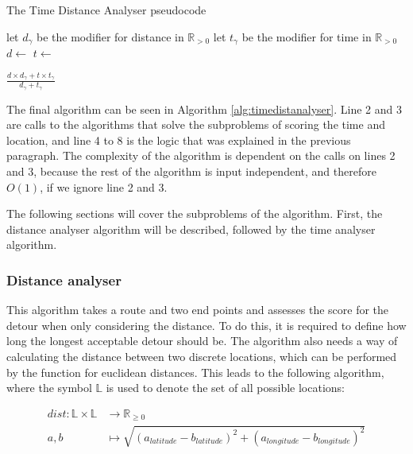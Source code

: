 \begin{algorithm}
	\caption{The Time Distance Analyser pseudocode}
	\label{alg:timedistanalyser}
	\begin{algorithmic}[1]
		\Require 
		\Statex let $d_\gamma$ be the modifier for distance in $\mathbb{R}_{>0}$
		\Statex let $t_\gamma$ be the modifier for time in $\mathbb{R}_{>0}$
		\Statex 
			\State $d\gets$
			\State $t\gets$
			
				\State \Return $\frac{d\times d_\gamma+t\times t_\gamma}{d_\gamma+t_\gamma}$
			\Else
				\State{}
			\EndIf
		\EndFunction
	\end{algorithmic}
\end{algorithm}

The final algorithm can be seen in Algorithm \ref{alg:timedistanalyser}.
Line 2 and 3 are calls to the algorithms that solve the subproblems of scoring the time and location, and line 4 to 8 is the logic that was explained in the previous paragraph.
The complexity of the algorithm is dependent on the calls on lines 2 and 3, because the rest of the algorithm is input independent, and therefore $O(1)$, if we ignore line 2 and 3.

The following sections will cover the subproblems of the algorithm.
First, the distance analyser algorithm will be described, followed by the time analyser algorithm.

\subsubsection{Distance analyser}
This algorithm takes a route and two end points and assesses the score for the detour when only considering the distance.
To do this, it is required to define how long the longest acceptable detour should be.
The algorithm also needs a way of calculating the distance between two discrete locations, which can be performed by the function for euclidean distances.
This leads to the following algorithm, where the symbol $\mathbb{L}$ is used to denote the set of all possible locations:

\begin{align*}
	dist : \mathbb{L}\times\mathbb{L} &\rightarrow \mathbb{R}_{\geq 0}\\
	a, b &\mapsto \sqrt{(a_{latitude} - b_{latitude})^2 + (a_{longitude} - b_{longitude})^2}
\end{align*}

